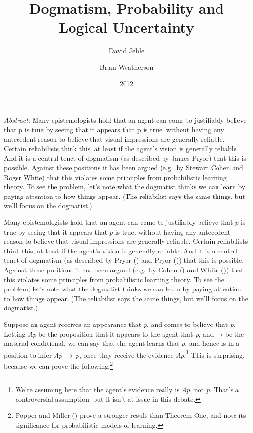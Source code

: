 \documentclass[
  11pt,
  letterpaper,
  DIV=11,
  numbers=noendperiod,
  twoside]{scrartcl}
\title{Dogmatism, Probability and Logical Uncertainty}
\author{David Jehle \and Brian Weatherson}
\date{2012}
\renewenvironment{abstract}
 {\vspace{-1.25cm}
 \quotation\small\noindent\emph{Abstract}:}
 {\endquotation}
\begin{document}
\maketitle
\begin{abstract}
Many epistemologists hold that an agent can come to justifiably believe
that p is true by seeing that it appears that p is true, without having
any antecedent reason to believe that visual impressions are generally
reliable. Certain reliabilists think this, at least if the agent's
vision is generally reliable. And it is a central tenet of dogmatism (as
described by James Pryor) that this is possible. Against these positions
it has been argued (e.g.~by Stewart Cohen and Roger White) that this
violates some principles from probabilistic learning theory. To see the
problem, let's note what the dogmatist thinks we can learn by paying
attention to how things appear. (The reliabilist says the same things,
but we'll focus on the dogmatist.)
\end{abstract}


Many epistemologists hold that an agent can come to justifiably believe
that \emph{p} is true by seeing that it appears that \emph{p} is true,
without having any antecedent reason to believe that visual impressions
are generally reliable. Certain reliabilists think this, at least if the
agent's vision is generally reliable. And it is a central tenet of
dogmatism (as described by Pryor () and
Pryor ()) that this is possible. Against
these positions it has been argued (e.g.~by Cohen
() and White
()) that this violates some principles
from probabilistic learning theory. To see the problem, let's note what
the dogmatist thinks we can learn by paying attention to how things
appear. (The reliabilist says the same things, but we'll focus on the
dogmatist.)

Suppose an agent receives an appearance that \emph{p}, and comes to
believe that \emph{p}. Letting \emph{Ap} be the proposition that it
appears to the agent that \emph{p}, and → be the material conditional,
we can say that the agent learns that \emph{p}, and hence is in a
position to infer \emph{Ap}~→~\emph{p}, once they receive the evidence
\emph{Ap}.\footnote{We're assuming here that the agent's evidence really
  is \emph{Ap}, not \emph{p}. That's a controversial assumption, but it
  isn't at issue in this debate.} This is surprising, because we can
prove the following.\footnote{Popper and Miller
  () prove a stronger result than
  Theorem One, and note its significance for probabilistic models of
  learning.}
\end{document}
